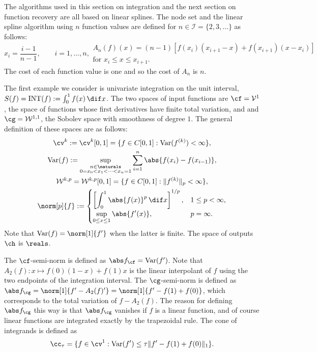 The algorithms used in this section on integration and the next section on function recovery are all based on linear splines.  The node set and the linear spline algorithm using $n$ function values are defined for $n \in \mathcal{I}=\{2,3,\ldots\}$ as follows:
\begin{subequations} \label{linearspline}
\begin{equation}
x_i=\frac{i-1}{n-1}, \qquad i=1, \ldots, n,
\end{equation}
\begin{multline}
A_{n}(f)(x)=(n-1) \left[ f(x_{i})(x_{i+1}-x) +f(x_{i+1})(x-x_i) \right] \\ \text{for }x_i \leq x \leq x_{i+1}.
\end{multline}
\end{subequations}
The cost of each function value is one and so the cost of  $A_n$ is $n$.

The first example we consider is univariate integration on the unit interval, $S(f)=\INT(f):=\int_{0}^{1}f(x) \, \dif x$.  The two spaces of input functions are $\cf=\mathcal{V}^{1}$, the space of functions whose first derivatives have finite total variation, and and $\cg=\mathcal{W}^{1,1}$, the Sobolev space with smoothness of degree $1$.  The general definition of these spaces are as follows:
\begin{subequations} \label{defSobolev}
\begin{gather} 
  \cv^{k}: =\cv^{k}[0,1]=\{f\in C[0,1]: \Var(f^{(k)}) < \infty \}, \\
  \Var(f) := \sup_{\substack{n \in \naturals\\ 0 = x_0 < x_1 < \cdots < x_{n} =1}} \sum_{i=1}^n \abs{f(x_i)-f(x_{i-1})}, \\
  \mathcal{W}^{k,p}=\mathcal{W}^{k,p}[0,1]=\{f\in C[0,1]: \|f^{(k)}\|_{p}<\infty\}, \\
\norm[p]{f}:= \begin{cases} \displaystyle \left[\int_0^1 \abs{f(x)}^p \, \dif x \right]^{1/p}, & 1 \le p < \infty,\\[1ex]
\displaystyle  \sup_{0 \le x \le 1} \abs{f'(x)}, & p=\infty.
\end{cases}
\end{gather}
\end{subequations}
Note that $\Var(f)=\norm[1]{f'}$ when the latter is finite.  The space of outputs $\ch$ is $\reals$.

The $\cf$-semi-norm is defined as $\Fnorm{f}=\Var(f')$.  Note that $A_2(f): x \mapsto f(0)(1-x)+f(1)x$ is the linear interpolant of $f$ using the two endpoints of the integration interval.  The $\cg$-semi-norm is defined as $\Gnorm{f}=\norm[1]{f'-A_2(f)'}=\norm[1]{f'-f(1)+f(0)}$, which corresponds to the total variation of $f-A_2(f)$.  The reason for defining $\Gnorm{f}$ this way is that $\Gnorm{f}$ vanishes if $f$ is a linear function, and of course linear functions are integrated exactly by the trapezoidal rule.  The cone of integrands is defined as  
\begin{equation}\label{coneinteg}
\cc_{\tau}=\{f\in \cv^{1}:\Var(f')\leq\tau\|f'-f(1)+f(0)\|_1\}.
\end{equation}

